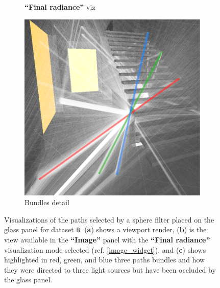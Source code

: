\begin{figure}
\begin{subfigure}[t]{0.32\linewidth}
		\caption{\textbf{“Final radiance”} viz}
	\end{subfigure}
	\begin{subfigure}[t]{0.32\linewidth}
		\includegraphics[width=\textwidth]{chapters/chapter_results/b_paths1highlight}
		\caption{Bundles detail}
		\label{b_paths1highlight}
	\end{subfigure}

	\caption{Visualizations of the paths selected by a sphere filter placed on the glass panel for dataset \texttt{B}. (\textbf{a}) shows a viewport render, (\textbf{b}) is the view available in the \textbf{“Image”} panel with the \textbf{“Final radiance”} visualization mode selected (ref. \ref{image_widget}), and (\textbf{c}) shows highlighted in red, green, and blue three paths bundles and how they were directed to three light sources but have been occluded by the glass panel.}
	\label{couple2paths1}
\end{figure}

